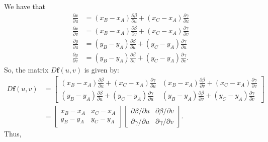 \documentclass[10pt]{article}
\newcommand{\ve}[1]{\mathbf{#1}}
\begin{document}
  We have that
  \begin{align*}
    \frac{\partial x}{\partial u} 
    &= (x_B - x_A) \frac{\partial \beta}{\partial u}  + (x_C - x_A) \frac{\partial \gamma}{\partial u} \\
    \frac{\partial x}{\partial v} 
    &= (x_B - x_A) \frac{\partial \beta}{\partial v}  + (x_C - x_A) \frac{\partial \gamma}{\partial v} \\
    \frac{\partial y}{\partial u} 
    &= (y_B - y_A) \frac{\partial \beta}{\partial u}  + (y_C - y_A) \frac{\partial \gamma}{\partial u} \\
    \frac{\partial y}{\partial v} 
    &= (y_B - y_A) \frac{\partial \beta}{\partial v}  + (y_C - y_A) \frac{\partial \gamma}{\partial v}.
  \end{align*}
  So, the matrix $D\ve{f}(u,v)$ is given by:
  \begin{align*}
    D\ve{f}(u,v) 
    &= \begin{bmatrix}
      (x_B - x_A) \frac{\partial \beta}{\partial u}  + (x_C - x_A) \frac{\partial \gamma}{\partial u} &
      (x_B - x_A) \frac{\partial \beta}{\partial v}  + (x_C - x_A) \frac{\partial \gamma}{\partial v} \\
      (y_B - y_A) \frac{\partial \beta}{\partial u}  + (y_C - y_A) \frac{\partial \gamma}{\partial u} &
      (y_B - y_A) \frac{\partial \beta}{\partial v}  + (y_C - y_A) \frac{\partial \gamma}{\partial v}
    \end{bmatrix} \\
    &= \begin{bmatrix}
      x_B - x_A & x_C - x_A \\
      y_B - y_A & y_C - y_A 
    \end{bmatrix}
    \begin{bmatrix}
      \partial \beta / \partial u & \partial \beta / \partial v \\
      \partial \gamma / \partial u & \partial \gamma / \partial v
    \end{bmatrix}.
  \end{align*}
  Thus,
\end{document}
